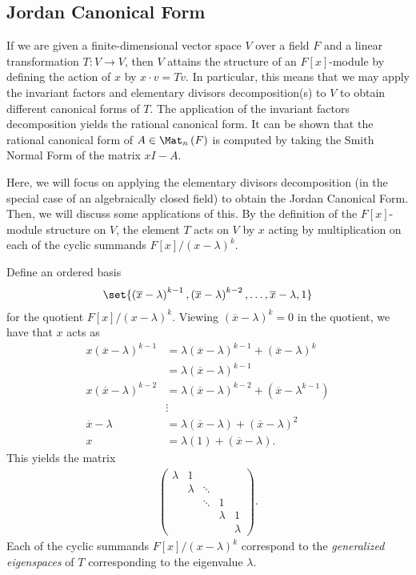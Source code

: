 \documentclass[10pt]{mypackage}
\begin{document}
\subsection{Jordan Canonical Form}%
If we are given a finite-dimensional vector space $V$ over a field $F$ and a linear transformation $T\colon V\rightarrow V$, then $V$ attains the structure of an $F[x]$-module by defining the action of $x$ by $x\cdot v = Tv$. In particular, this means that we may apply the invariant factors and elementary divisors decomposition(s) to $V$ to obtain different canonical forms of $T$. The application of the invariant factors decomposition yields the rational canonical form. It can be shown that the rational canonical form of $A\in \Mat_{n}\left( F \right)$ is computed by taking the Smith Normal Form of the matrix $xI - A$.

Here, we will focus on applying the elementary divisors decomposition (in the special case of an algebraically closed field) to obtain the Jordan Canonical Form. Then, we will discuss some applications of this. By the definition of the $F[x]$-module structure on $V$, the element $T$ acts on $V$ by $x$ acting by multiplication on each of the cyclic summands $F[x]/\left( x-\lambda \right)^{k}$.

Define an ordered basis
\begin{align*}
  \set{ \left( \overline{x}-\lambda \right)^{k-1}, \left( \overline{x}-\lambda \right)^{k-2},\dots, \overline{x}-\lambda, 1 }
\end{align*}
for the quotient $F[x]/\left( x-\lambda \right)^{k}$. Viewing $ \left( \overline{x}-\lambda \right)^{k} = 0 $ in the quotient, we have that $x$ acts as
\begin{align*}
  x\left( \overline{x}-\lambda \right)^{k-1} &= \lambda \left( \overline{x}-\lambda \right)^{k-1} + \left( \overline{x}-\lambda \right)^{k}\\
                                             &= \lambda \left( \overline{x}-\lambda \right)^{k-1}\\
  x\left( \overline{x}-\lambda \right)^{k-2} &= \lambda \left( \overline{x}-\lambda \right)^{k-2} + \left( \overline{x}-\lambda^{k-1} \right)\\
                                             &\vdots\\
  \overline{x}-\lambda &= \lambda \left( \overline{x}-\lambda \right) + \left( \overline{x}-\lambda \right)^{2}\\
  x &= \lambda(1) + \left( \overline{x}-\lambda \right).
\end{align*}
This yields the matrix
\begin{align*}
  \begin{pmatrix}\lambda & 1 & & & \\ & \lambda & \ddots & & \\ & & \ddots & 1 & \\ & & & \lambda & 1 \\ & & & & \lambda\end{pmatrix}.
\end{align*}
Each of the cyclic summands $F[x]/\left( x-\lambda \right)^{k}$ correspond to the \textit{generalized eigenspaces} of $T$ corresponding to the eigenvalue $\lambda$.
\end{document}
